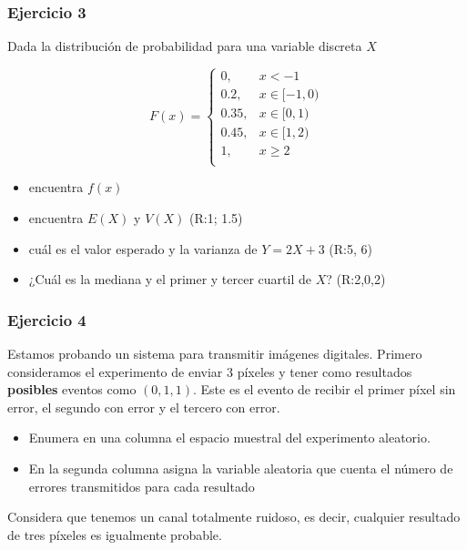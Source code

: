 \documentclass[
]{book}
\providecommand{\tightlist}{%
  \setlength{\itemsep}{0pt}\setlength{\parskip}{0pt}}
\begin{document}
\hypertarget{ejercicio-3-2}{%
\subsubsection{Ejercicio 3}\label{ejercicio-3-2}}

Dada la distribución de probabilidad para una variable discreta \(X\)

\[
    F(x)= 
\begin{cases}
0, & x < -1 \\
0.2,& x \in [-1,0)\\
0.35,& x \in [0,1)\\
0.45,& x \in [1,2)\\
1,& x \geq 2\\
\end{cases}
\]

\begin{itemize}
\tightlist
\item
  encuentra \(f(x)\)
\item
  encuentra \(E(X)\) y \(V(X)\) (R:1; 1.5)
\item
  cuál es el valor esperado y la varianza de \(Y=2X+3\) (R:5, 6)
\item
  ¿Cuál es la mediana y el primer y tercer cuartil de \(X\)? (R:2,0,2)
\end{itemize}

\hypertarget{ejercicio-4-1}{%
\subsubsection{Ejercicio 4}\label{ejercicio-4-1}}

Estamos probando un sistema para transmitir imágenes digitales. Primero consideramos el experimento de enviar \(3\) píxeles y tener como resultados \textbf{posibles} eventos como \((0,1,1)\). Este es el evento de recibir el primer píxel sin error, el segundo con error y el tercero con error.

\begin{itemize}
\item
  Enumera en una columna el espacio muestral del experimento aleatorio.
\item
  En la segunda columna asigna la variable aleatoria que cuenta el número de errores transmitidos para cada resultado
\end{itemize}

Considera que tenemos un canal totalmente ruidoso, es decir, cualquier resultado de tres píxeles es igualmente probable.
\end{document}
